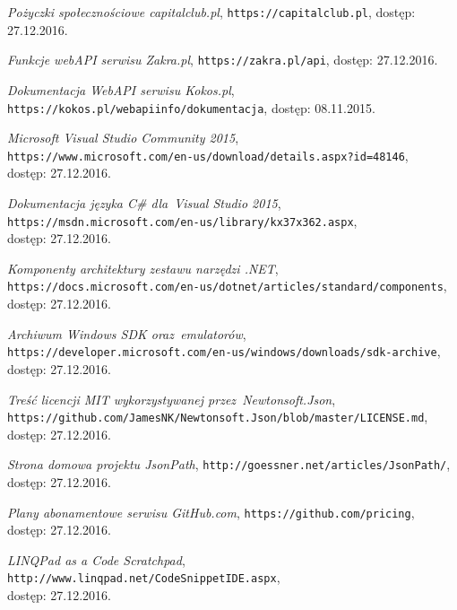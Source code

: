 \documentclass[a4paper,twoside,titlepage,openright]{book}
\begin{document}
\begin{thebibliography}{99}
 \textit{Pożyczki społecznościowe capitalclub.pl}, 
\texttt{https://capitalclub.pl}, dostęp: 27.12.2016.

 \textit{Funkcje webAPI serwisu Zakra.pl}, 
\texttt{https://zakra.pl/api}, dostęp: 27.12.2016.

 \textit{Dokumentacja WebAPI serwisu Kokos.pl}, 
\texttt{https://kokos.pl/webapiinfo/dokumentacja}, dostęp: 08.11.2015.

 \textit{Microsoft Visual Studio Community 2015}, \\
\texttt{https://www.microsoft.com/en-us/download/details.aspx?id=48146}, \\dostęp: 27.12.2016.

 \textit{Dokumentacja języka C\# dla~Visual Studio 2015}, \\
\texttt{https://msdn.microsoft.com/en-us/library/kx37x362.aspx}, \\dostęp: 27.12.2016.

 \textit{Komponenty architektury zestawu narzędzi .NET}, \\
\texttt{https://docs.microsoft.com/en-us/dotnet/articles/standard/components},\\ dostęp: 27.12.2016.

 \textit{Archiwum Windows SDK oraz~emulatorów}, \\
\texttt{https://developer.microsoft.com/en-us/windows/downloads/sdk-archive}, \\dostęp: 27.12.2016.

 \textit{Treść licencji MIT wykorzystywanej przez~Newtonsoft.Json}, \\
\texttt{https://github.com/JamesNK/Newtonsoft.Json/blob/master/LICENSE.md}, \\dostęp: 27.12.2016.

 \textit{Strona domowa projektu JsonPath}, 
\texttt{http://goessner.net/articles/JsonPath/}, \\dostęp: 27.12.2016.

 \textit{Plany abonamentowe serwisu GitHub.com}, 
\texttt{https://github.com/pricing}, \\dostęp: 27.12.2016.

 \textit{LINQPad as a Code Scratchpad}, 
\texttt{http://www.linqpad.net/CodeSnippetIDE.aspx}, \\dostęp: 27.12.2016.


\end{thebibliography}
\end{document}
